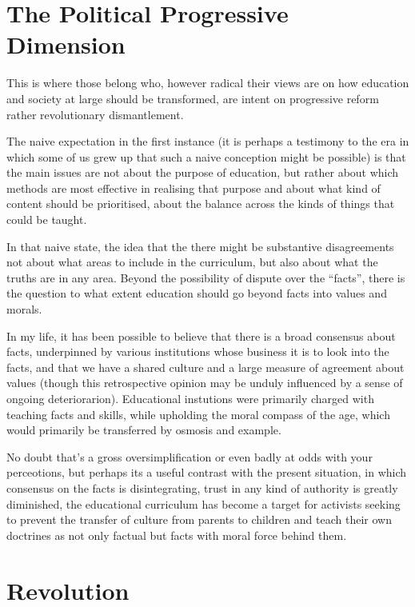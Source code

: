 \documentclass[10pt,titlepage]{article}
\begin{document}
\section{The Political Progressive Dimension}

This is where those belong who, however radical their views are on how education and society at large should be transformed, are intent on progressive reform rather revolutionary dismantlement.

The naive expectation in the first instance (it is perhaps a testimony to the era in which some of us grew up that such a naive conception might be possible) is that the main issues are not about the purpose of education, but rather about which methods are most effective in realising that purpose and about what kind of content should be prioritised, about the balance across the kinds of things that could be taught.

In that naive state, the idea that the there might be substantive disagreements not about what areas to include in the curriculum, but also about what the truths are in any area.
Beyond the possibility of dispute over the ``facts'', there is the question to what extent education should go beyond facts into values and morals.

In my life, it has been possible to believe that there is a broad consensus about facts, underpinned by various institutions whose business it is to look into the facts, and that we have a shared culture and a large measure of agreement about values (though this retrospective opinion may be unduly influenced by a sense of ongoing deteriorarion).
Educational instutions were primarily charged with teaching facts and skills, while upholding the moral compass of the age, which would primarily be transferred by osmosis and example.

No doubt that's a gross oversimplification or even badly at odds with your perceotions, but perhaps its a useful contrast with the present situation, in which consensus on the facts is disintegrating, trust in any kind of authority is greatly diminished, the educational curriculum has become a target for activists seeking to prevent the transfer of culture from parents to children and teach their own doctrines as not only factual but facts with moral force behind them.

\section{Revolution}
\end{document}
